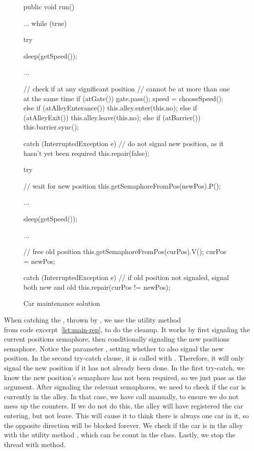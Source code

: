 \begin{figure}[H]
\label{lst:main-run}
  \begin{java}
public void run() {
    ...
    while (true) {
        try {
            sleep(getSpeed());

            ...

            // check if at any significant position
            // cannot be at more than one at the same time
            if (atGate()) {
                gate.pass();
                speed = chooseSpeed();
            } else if (atAlleyEnterance()) {
                this.alley.enter(this.no);
            } else if (atAlleyExit()) {
                this.alley.leave(this.no);
            } else if (atBarrier()) {
                this.barrier.sync();
            }

        } catch (InterruptedException e) {
            // do not signal new position, as it hasn't yet been required
            this.repair(false);
        }

        try {
            // wait for new position
            this.getSemaphoreFromPos(newPos).P();

            ...

            sleep(getSpeed());

            ...

            // free old position
            this.getSemaphoreFromPos(curPos).V();
            curPos = newPos;

        } catch (InterruptedException e) {
            // if old position not signaled, signal both new and old
            this.repair(curPos != newPos);
        }
    }
}
  \end{java}
  \caption{Car maintenance solution}
\end{figure}

When catching the , thrown by
, we use the utility method \\
 from code excerpt~\ref{lst:main-rep}, to do
the cleanup. It works by first signaling the current positions
semaphore, then conditionally signaling the new positions
semaphore. Notice the parameter , setting whether to
also signal the new position. In the second try-catch clause, it is
called with . Therefore, it will only
signal the new position if it has not already been done. In the first
try-catch, we know the new position's semaphore has not been required,
so we just pass  as the argument. After signaling the
relevant semaphores, we need to check if the car is currently in the
alley. In that case, we have call 
manually, to ensure we do not mess up the counters. If we do not do
this, the alley will have registered the car entering, but not
leave. This will cause it to think there is always one car in it, so
the opposite direction will be blocked forever. We check if the car is
in the alley with the utility method , which can be
count in the  class. Lastly, we stop the thread with
 method.

